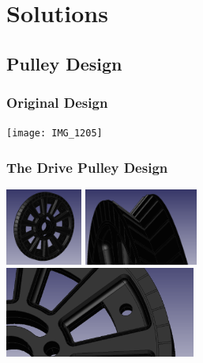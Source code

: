 \documentclass{beamer}
\begin{document}
\section{Solutions}
\subsection{Pulley Design}
\begin{frame}
\frametitle{Original Design}
\centering\texttt{[image: IMG\_1205]}
\end{frame}
\begin{frame}
\frametitle{The Drive Pulley Design}
\centering\includegraphics[height=2.5cm]{pull1}
\centering\includegraphics[height=2.5cm]{pull3} \\
\centering\includegraphics[height=2.95cm]{pull2}

\end{frame}
\end{document}
